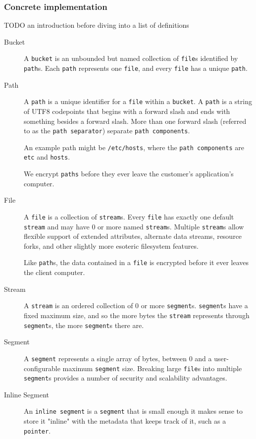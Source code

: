 \documentclass[a4paper,10pt]{article} \usepackage[utf8]{inputenc}
\newcommand{\x}[1]{{\tt #1}} \newcommand{\code}[1]{{\tt #1}}
\newcommand{\todo}[1]{{\color{red} TODO #1 }}
\begin{document}
\subsubsection{Concrete implementation}

\todo{an introduction before diving into a list of definitions}

\begin{description}
\item[Bucket] A \x{bucket} is an unbounded but named
collection of \x{file}s identified by \x{path}s. Each \x{path} represents one
\x{file}, and every \x{file} has a unique \x{path}.

\item[Path] A \x{path} is a unique identifier for a \x{file} within a
\x{bucket}. A \x{path} is a string of UTF8 codepoints that begins with a forward
slash and ends with something besides a forward slash. More than one forward
slash (referred to as the \x{path separator}) separate \x{path components}.

An example path might be \code{/etc/hosts}, where the \x{path components} are
\code{etc} and \code{hosts}.

We encrypt \x{paths} before they ever leave the customer's application's
computer.

\item[File] A \x{file} is a collection of \x{stream}s. Every \x{file} has
exactly one default \x{stream} and may have 0 or more named \x{stream}s.
Multiple \x{stream}s allow flexible support of extended attributes, alternate
data streams, resource forks, and other slightly more esoteric filesystem
features.

Like \x{path}s, the data contained in a \x{file} is encrypted before it ever
leaves the client computer.

\item[Stream] A \x{stream} is an ordered collection of 0 or more \x{segment}s.
\x{segment}s have a fixed maximum size, and so the more bytes the \x{stream}
represents through \x{segment}s, the more \x{segment}s there are.

\item[Segment] A \x{segment} represents a single array of bytes, between 0 and a
user-configurable maximum \x{segment} size. Breaking large \x{file}s into
multiple \x{segment}s provides a number of security and scalability advantages.

\item[Inline Segment] An \x{inline segment} is a \x{segment} that is small
enough it makes sense to store it "inline" with the metadata that keeps track of
it, such as a \x{pointer}.


\end{description}
\end{document}
